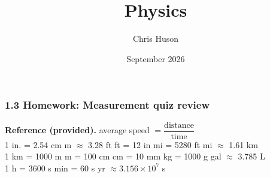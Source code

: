 \documentclass[12pt, twoside]{article}
\title{Physics}
\author{Chris Huson}
\date{September 2026}
\begin{document}
\subsubsection*{1.3 Homework: Measurement quiz review}

\textbf{Reference (provided).} \quad
average speed $= \dfrac{\text{distance}}{\text{time}}$ \\[0.1cm]
1 in. = 2.54 cm  m $\approx$ 3.28 ft  ft = 12 in  mi = 5280 ft
 mi $\approx$ 1.61 km \\
1 km = 1000 m  m = 100 cm  cm = 10 mm  kg = 1000 g
 gal $\approx$ 3.785 L \\
1 h = 3600 s  min = 60 s  yr $\approx 3.156 \times 10^{7}$ s

\vspace{0.25cm}
\end{document}
